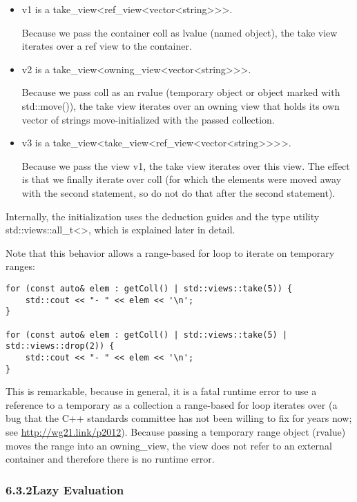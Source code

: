 \begin{itemize}
\item
v1 is a take\_view<ref\_view<vector<string>{}>{}>.

Because we pass the container coll as lvalue (named object), the take view iterates over a ref view to the container.

\item
v2 is a take\_view<owning\_view<vector<string>{}>{}>.

Because we pass coll as an rvalue (temporary object or object marked with std::move()), the take view iterates over an owning view that holds its own vector of strings move-initialized with the passed collection.

\item
v3 is a take\_view<take\_view<ref\_view<vector<string>{}>{}>{}>.

Because we pass the view v1, the take view iterates over this view. The effect is that we finally iterate over coll (for which the elements were moved away with the second statement, so do not do that after the second statement).
\end{itemize}

Internally, the initialization uses the deduction guides and the type utility std::views::all\_t<>, which is explained later in detail.

Note that this behavior allows a range-based for loop to iterate on temporary ranges:

\begin{lstlisting}[style=styleCXX]
for (const auto& elem : getColl() | std::views::take(5)) {
	std::cout << "- " << elem << '\n';
}

for (const auto& elem : getColl() | std::views::take(5) | std::views::drop(2)) {
	std::cout << "- " << elem << '\n';
}
\end{lstlisting}

This is remarkable, because in general, it is a fatal runtime error to use a reference to a temporary as a collection a range-based for loop iterates over (a bug that the C++ standards committee has not been willing to fix for years now; see \url{http://wg21.link/p2012}). Because passing a temporary range object (rvalue) moves the range into an owning\_view, the view does not refer to an external container and therefore there is no runtime error.

\subsubsection*{ 6.3.2\hspace{0.2cm}Lazy Evaluation}

